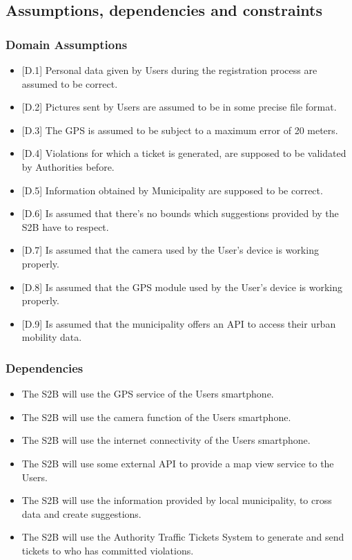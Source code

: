 \subsection{Assumptions,
dependencies
and
constraints}


\subsubsection{Domain Assumptions}
\begin{itemize}
    \item {[D.1]} Personal data given by Users during the registration process are assumed to be correct.
    \item {[D.2]} Pictures sent by Users are assumed to be in some precise file format.
    \item {[D.3]} The GPS is assumed to be subject to a maximum error of 20 meters.
    \item {[D.4]} Violations for which a ticket is generated, are supposed to be validated by Authorities before.
    \item {[D.5]} Information obtained by Municipality are supposed to be correct.
    \item {[D.6]} Is assumed that there's no bounds which suggestions provided by the S2B have to respect.
    \item {[D.7]} Is assumed that the camera used by the User's device is working properly.
    \item {[D.8]} Is assumed that the GPS module used by the User's device is working properly.
     \item {[D.9]} Is assumed that the municipality offers an API to access their urban mobility data.
    
\end{itemize}

\subsubsection{Dependencies}
\begin{itemize}
    \item The S2B will use the GPS service of the Users smartphone.
    \item The S2B will use the camera function of the Users smartphone.
    \item The S2B will use the internet connectivity of the Users smartphone.
    \item The S2B will use some external API to provide  a map view service to the Users.
    \item The S2B will use the information provided by local municipality, to cross data and create suggestions.
    \item The S2B will use the Authority Traffic Tickets System to generate and send tickets to who has committed violations.\\
\end{itemize}


